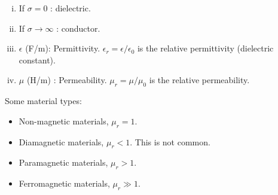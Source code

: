 \begin{enumerate}[(i)]
\item If \( \sigma = 0 \) : dielectric.
\item If \( \sigma \rightarrow \infty \) : conductor.
\item \( \epsilon \) (\si{F/m}): Permittivity.  \( \epsilon_r = \epsilon/\epsilon_0 \) is the relative permittivity (dielectric constant).
\item \( \mu \) (\si{H/m}) : Permeability.  \( \mu_r = \mu/\mu_0 \) is the relative permeability.
\end{enumerate}

Some material types:

\begin{itemize}
\item Non-magnetic materials, \( \mu_r = 1 \).
\item Diamagnetic materials, \( \mu_r < 1 \).  This is not common.
\item Paramagnetic materials, \( \mu_r > 1 \).
\item Ferromagnetic materials, \( \mu_r \gg 1 \).
\end{itemize}

